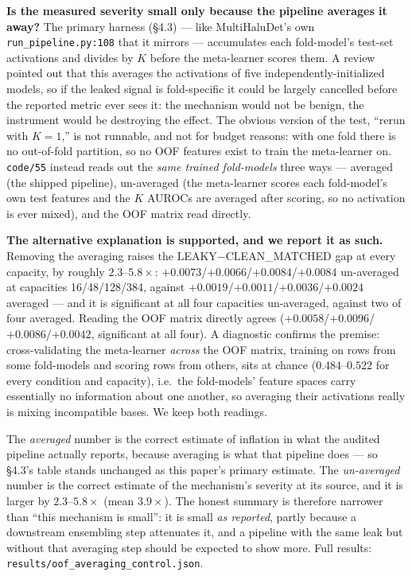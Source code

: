 \documentclass[10pt]{article} %
\begin{document}
\textbf{Is the measured severity small only because the pipeline averages it
away?} The primary harness (§4.3) --- like MultiHaluDet's own
\texttt{run\_pipeline.py:108} that it mirrors --- accumulates each
fold-model's test-set activations and divides by $K$ before the meta-learner
scores them. A review pointed out that this averages the activations of five
independently-initialized models, so if the leaked signal is fold-specific it
could be largely cancelled before the reported metric ever sees it: the
mechanism would not be benign, the instrument would be destroying the effect.
The obvious version of the test, ``rerun with $K=1$,'' is not runnable, and
not for budget reasons: with one fold there is no out-of-fold partition, so no
OOF features exist to train the meta-learner on. \texttt{code/55} instead
reads out the \emph{same trained fold-models} three ways --- averaged (the
shipped pipeline), un-averaged (the meta-learner scores each fold-model's own
test features and the $K$ AUROCs are averaged after scoring, so no activation
is ever mixed), and the OOF matrix read directly.

\textbf{The alternative explanation is supported, and we report it as such.}
Removing the averaging raises the LEAKY$-$CLEAN\_MATCHED gap at every
capacity, by roughly $2.3$--$5.8\times$: $+0.0073$/$+0.0066$/$+0.0084$/$+0.0084$
un-averaged at capacities 16/48/128/384, against
$+0.0019$/$+0.0011$/$+0.0036$/$+0.0024$ averaged --- and it is significant at
all four capacities un-averaged, against two of four averaged. Reading the OOF
matrix directly agrees ($+0.0058$/$+0.0096$/$+0.0086$/$+0.0042$, significant
at all four). A diagnostic confirms the premise: cross-validating the
meta-learner \emph{across} the OOF matrix, training on rows from some
fold-models and scoring rows from others, sits at chance
($0.484$--$0.522$ for every condition and capacity), i.e.\ the fold-models'
feature spaces carry essentially no information about one another, so
averaging their activations really is mixing incompatible bases. We keep both
readings.

The \emph{averaged} number is the correct estimate of inflation in
what the audited pipeline actually reports, because averaging is what that
pipeline does --- so §4.3's table stands unchanged as this paper's primary estimate. The \emph{un-averaged} number is the correct estimate of the
mechanism's severity at its source, and it is larger by
$2.3$--$5.8\times$ (mean $3.9\times$). The
honest summary is therefore narrower than ``this mechanism is small'': it is
small \emph{as reported}, partly because a downstream ensembling step
attenuates it, and a pipeline with the same leak but without that averaging
step should be expected to show more. Full results:
\texttt{results/oof\_averaging\_control.json}.
\end{document}
